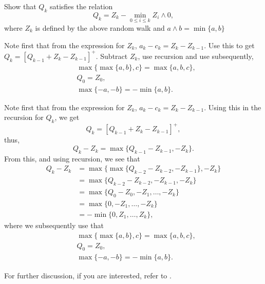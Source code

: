 \begin{exercise}
Show that  $Q_k$ satisfies the relation
\begin{equation}\label{eq:reich1}
  Q_k = Z_k - \min_{0\leq i \leq k} Z_i\wedge 0,
\end{equation}
where $Z_k$ is defined by the above random walk and
$a\wedge b = \min\{a,b\}$ 
\begin{hint}
Note first that from the expression for $Z_k$,
  $a_k - c_k = Z_k - Z_{k-1}$. Use this to get
  $Q_k = [Q_{k-1} +Z_k- Z_{k-1}]^+$. Subtract $Z_k$, use recursion and
  use subsequently,
\begin{align*}
&\max\{\max\{a,b\}, c\} = \max\{a,b,c\}, \\
&Q_0 = Z_0, \\
&\max\{-a, -b \} = -\min\{a,b\}.
\end{align*}
\end{hint}
\begin{solution}
Note first that from the expression
for $Z_k$, $a_k - c_k = Z_k - Z_{k-1}$. Using this in the recursion
for $Q_k$, we get
\begin{equation*}
  Q_k = [Q_{k-1} +Z_k- Z_{k-1}]^+,
\end{equation*}
thus, 
\begin{equation*}
  Q_k - Z_{k} = \max\{Q_{k-1} - Z_{k-1}, -Z_k\}.
\end{equation*}
From this, and using recursion, we see that
\begin{equation*}
  \begin{split}
  Q_k - Z_{k} 
&= \max\{\max\{Q_{k-2} - Z_{k-2}, -Z_{k-1}\}, -Z_k\} \\
&= \max\{Q_{k-2} - Z_{k-2}, -Z_{k-1}, -Z_k\} \\
&= \max\{Q_{0} - Z_{0}, -Z_1, \ldots, -Z_k\} \\
&= \max\{0, -Z_1, \ldots, -Z_k\} \\
&= - \min\{0, Z_1, \ldots, Z_k\},
  \end{split}
  \end{equation*}
where we subsequently use that
\begin{align*}
&\max\{\max\{a,b\}, c\} = \max\{a,b,c\}, \\
&Q_0 = Z_0, \\
&\max\{-a, -b \} = -\min\{a,b\}.
\end{align*}
 
For further discussion, if you are interested, refer to
  \citet{baccelli88:_sampl_m_m}.
\end{solution}
\end{exercise}

